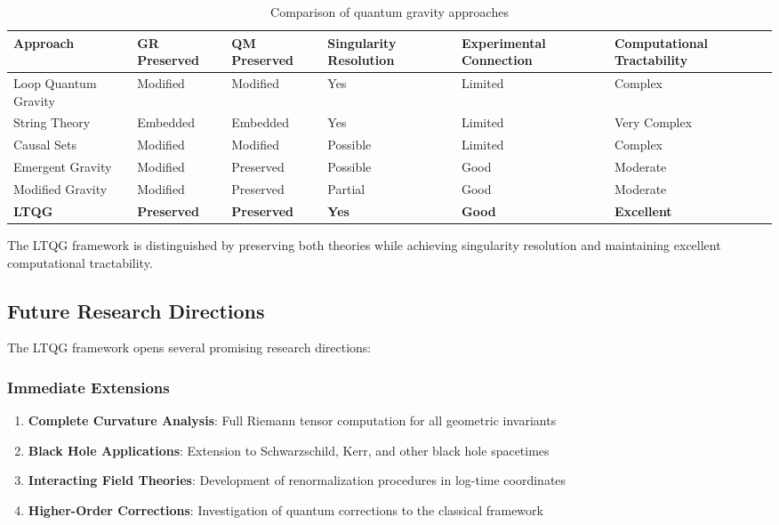 \begin{table}[htbp]
\centering
\footnotesize
\begin{tabular}{p{2.5cm}p{1.8cm}p{1.8cm}p{1.8cm}p{1.8cm}p{1.8cm}}
\toprule
\textbf{Approach} & \textbf{GR Preserved} & \textbf{QM Preserved} & \textbf{Singularity Resolution} & \textbf{Experimental Connection} & \textbf{Computational Tractability} \\
\midrule
Loop Quantum Gravity & Modified & Modified & Yes & Limited & Complex \\
String Theory & Embedded & Embedded & Yes & Limited & Very Complex \\
Causal Sets & Modified & Modified & Possible & Limited & Complex \\
Emergent Gravity & Modified & Preserved & Possible & Good & Moderate \\
Modified Gravity & Modified & Preserved & Partial & Good & Moderate \\
\textbf{LTQG} & \textbf{Preserved} & \textbf{Preserved} & \textbf{Yes} & \textbf{Good} & \textbf{Excellent} \\
\bottomrule
\end{tabular}
\caption{Comparison of quantum gravity approaches}
\label{tab:approach_comparison}
\end{table}

The LTQG framework is distinguished by preserving both theories while achieving singularity resolution and maintaining excellent computational tractability.

\subsection{Future Research Directions}
\label{subsec:future_directions}

The LTQG framework opens several promising research directions:

\subsubsection{Immediate Extensions}

\begin{enumerate}
\item \textbf{Complete Curvature Analysis}: Full Riemann tensor computation for all geometric invariants
\item \textbf{Black Hole Applications}: Extension to Schwarzschild, Kerr, and other black hole spacetimes
\item \textbf{Interacting Field Theories}: Development of renormalization procedures in log-time coordinates
\item \textbf{Higher-Order Corrections}: Investigation of quantum corrections to the classical framework
\end{enumerate}


